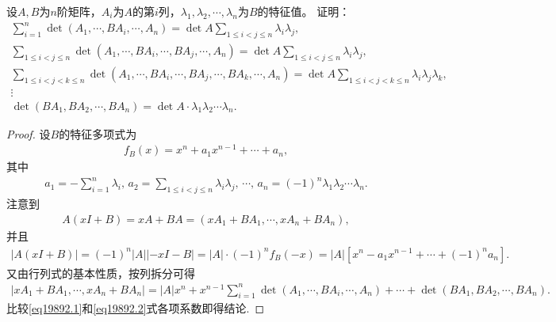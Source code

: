 \documentclass[../../main.tex]{subfiles}%
\begin{document}
\begin{example}
设\( A,B \)为\( n \)阶矩阵，\( A_i \)为\( A \)的第\( i \)列，\( \lambda_1,\lambda_2,\cdots,\lambda_n \)为\( B \)的特征值。
证明：
\begin{gather*}
\sum_{i=1}^n{\det \left( A_1,\cdots ,BA_i,\cdots ,A_n \right)}=\det A\sum_{1\leqslant i<j\leqslant n}{\lambda _i\lambda _j},
\\
\sum_{1\leqslant i<j\leqslant n}{\det \left( A_1,\cdots ,BA_i,\cdots ,BA_j,\cdots ,A_n \right)}=\det A\sum_{1\leqslant i<j\leqslant n}{\lambda _i\lambda _j},
\\
\sum_{1\leqslant i<j<k\leqslant n}{\det \left( A_1,\cdots ,BA_i,\cdots ,BA_j,\cdots ,BA_k,\cdots ,A_n \right)}=\det A\sum_{1\leqslant i<j<k\leqslant n}{\lambda _i\lambda _j\lambda _k},
\\
\vdots 
\\
\det \left( BA_1,BA_2,\cdots ,BA_n \right) =\det A\cdot \lambda _1\lambda _2\cdots \lambda _n.
\end{gather*}
\end{example}
\begin{proof}
设\( B \)的特征多项式为
\begin{align*}
f_B(x) = x^n + a_1x^{n-1} + \cdots + a_n,
\end{align*}
其中
\begin{align*}
a_1 = -\sum_{i=1}^n \lambda_i,\, a_2 = \sum_{1 \leqslant i < j \leqslant n} \lambda_i\lambda_j,\, \cdots,\, a_n = (-1)^n \lambda_1\lambda_2\cdots\lambda_n.
\end{align*}
注意到
\begin{align*}
A(xI + B) = xA + BA = (xA_1 + BA_1, \cdots, xA_n + BA_n),
\end{align*}
并且
\begin{align}
|A(xI + B)| = (-1)^n |A| |-xI - B| = |A| \cdot (-1)^n f_B(-x) = |A| \left[ x^n - a_1x^{n-1} + \cdots + (-1)^n a_n \right]. \label{eq19892.1}
\end{align}
又由行列式的基本性质，按列拆分可得
\begin{align}
|xA_1 + BA_1, \cdots, xA_n + BA_n| = |A|x^n + x^{n-1} \sum_{i=1}^n \det(A_1, \cdots, BA_i, \cdots, A_n) + \cdots + \det(BA_1, BA_2, \cdots, BA_n). \label{eq19892.2}
\end{align}
比较\eqref{eq19892.1}和\eqref{eq19892.2}式各项系数即得结论.
\end{proof}
\end{document}
